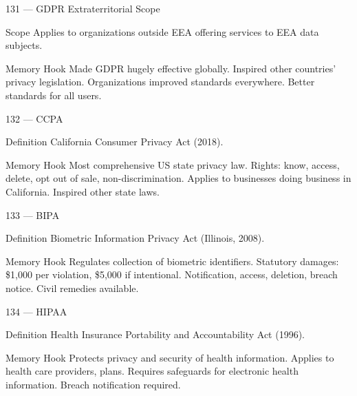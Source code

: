 \documentclass[aspectratio=169,8pt]{beamer}
\begin{document}
	\begin{frame}{131 --- GDPR Extraterritorial Scope}
		\begin{block}{Scope}
			Applies to organizations outside EEA offering services to EEA data subjects.
		\end{block}
		\begin{block}{Memory Hook}
			Made GDPR hugely effective globally. Inspired other countries' privacy legislation. Organizations improved standards everywhere. Better standards for all users.
		\end{block}
	\end{frame}
	
	\begin{frame}{132 --- CCPA}
		\begin{block}{Definition}
			California Consumer Privacy Act (2018).
		\end{block}
		\begin{block}{Memory Hook}
			Most comprehensive US state privacy law. Rights: know, access, delete, opt out of sale, non-discrimination. Applies to businesses doing business in California. Inspired other state laws.
		\end{block}
	\end{frame}
	
	\begin{frame}{133 --- BIPA}
		\begin{block}{Definition}
			Biometric Information Privacy Act (Illinois, 2008).
		\end{block}
		\begin{block}{Memory Hook}
			Regulates collection of biometric identifiers. Statutory damages: \$1,000 per violation, \$5,000 if intentional. Notification, access, deletion, breach notice. Civil remedies available.
		\end{block}
	\end{frame}
	
	\begin{frame}{134 --- HIPAA}
		\begin{block}{Definition}
			Health Insurance Portability and Accountability Act (1996).
		\end{block}
		\begin{block}{Memory Hook}
			Protects privacy and security of health information. Applies to health care providers, plans. Requires safeguards for electronic health information. Breach notification required.
		\end{block}
	\end{frame}
	
\end{document}
